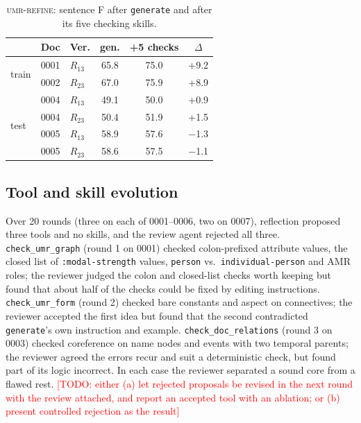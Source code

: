 \documentclass[11pt]{article}
\newcommand{\amr}{\textsc{AMR}\xspace}
\newcommand{\refine}{\textsc{umr-refine}\xspace}
\newcommand{\skill}[1]{\texttt{#1}}
\newcommand{\todo}[1]{\textcolor{red}{[TODO: #1]}}
\begin{document}
\begin{table}[t]
\centering\small
\setlength{\tabcolsep}{4pt}
\begin{tabular}{@{}lllccc@{}}
\toprule
& Doc & Ver. & gen. & +5 checks & $\Delta$ \\
\midrule
\multirow{2}{*}{train} & 0001 & $R_{13}$ & 65.8 & 75.0 & +9.2 \\
 & 0002 & $R_{23}$ & 67.0 & 75.9 & +8.9 \\
\midrule
\multirow{4}{*}{test} & 0004 & $R_{13}$ & 49.1 & 50.0 & +0.9 \\
 & 0004 & $R_{23}$ & 50.4 & 51.9 & +1.5 \\
 & 0005 & $R_{13}$ & 58.9 & 57.6 & $-$1.3 \\
 & 0005 & $R_{23}$ & 58.6 & 57.5 & $-$1.1 \\
\bottomrule
\end{tabular}
\caption{\refine: sentence F after \skill{generate} and after its five checking skills.}
\label{tab:refine}
\end{table}

\subsection{Tool and skill evolution}

Over 20 rounds (three on each of 0001--0006, two on 0007), reflection proposed three tools and no skills, and the review agent rejected all three. \texttt{check\_umr\_graph} (round 1 on 0001) checked colon-prefixed attribute values, the closed list of \texttt{:modal-strength} values, \texttt{person} vs.\ \texttt{individual-person} and \amr roles; the reviewer judged the colon and closed-list checks worth keeping but found that about half of the checks could be fixed by editing instructions. \texttt{check\_umr\_form} (round 2) checked bare constants and aspect on connectives; the reviewer accepted the first idea but found that the second contradicted \skill{generate}'s own instruction and example. \texttt{check\_doc\_relations} (round 3 on 0003) checked coreference on name nodes and events with two temporal parents; the reviewer agreed the errors recur and suit a deterministic check, but found part of its logic incorrect. In each case the reviewer separated a sound core from a flawed rest. \todo{either (a) let rejected proposals be revised in the next round with the review attached, and report an accepted tool with an ablation; or (b) present controlled rejection as the result}

\end{document}
